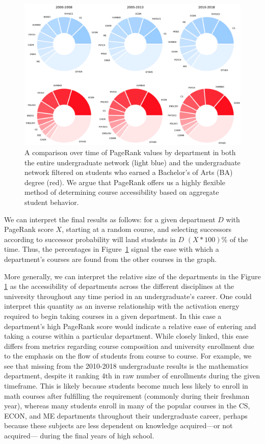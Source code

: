 \documentclass{sigchi}
\begin{document}
\begin{figure}
    \centering
    \includegraphics[width=\columnwidth]{final-evolution.pdf}
    \caption{A comparison over time of PageRank values by department in both the entire undergraduate network (light blue) and the undergraduate network filtered on students who earned a Bachelor's of Arts (BA) degree (red). We argue that PageRank offers us a highly flexible method of determining course accessibility based on aggregate student behavior.}
    \label{fig:evolution}
\end{figure}

We can interpret the final results as follows: for a given department
$D$ with PageRank score $X$, starting at a random course, and
selecting successors according to successor probability will land
students in $D$ $(X * 100)$\% of the time. Thus, the percentages in
Figure~\ref{fig:evolution} signal the ease with which a department's
courses are found from the other courses in the graph.

More generally, we can interpret the relative size of the departments
in the Figure \ref{fig:evolution} as the accessibility of departments
across the different disciplines at the university throughout any time
period in an undergraduate's career. One could interpret this quantity
as an inverse relationship with the activation energy required to
begin taking courses in a given department. In this case a
department's high PageRank score would indicate a relative ease of
entering and taking a course within a particular department. While
closely linked, this ease differs from metrics regarding course
composition and university enrollment due to the emphasis on the flow
of students from course to course. For example, we see that missing
from the 2010-2018 undergraduate results is the mathematics
department, despite it ranking 4th in raw number of enrollments during
the given timeframe. This is likely because students become much less
likely to enroll in math courses after fulfilling the requirement
(commonly during their freshman year), whereas many students enroll in
many of the popular courses in the CS, ECON, and ME departments
throughout their undergraduate career, perhaps because these subjects
are less dependent on knowledge acquired---or not acquired--- during
the final years of high school.
\end{document}
